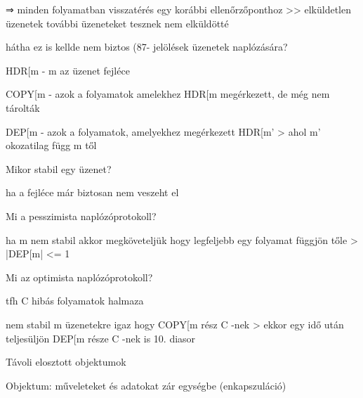\documentclass[12pt]{article}
\begin{document}
\begin{description}
                                        ⇒ minden folyamatban visszatérés egy korábbi ellenőrzőponthoz
                                        >> elküldetlen üzenetek további üzeneteket tesznek nem elküldötté
                                    \item hátha ez is kellde nem biztos (87-
                                        jelölések üzenetek naplózására?
                                    \item HDR[m 
                                            - m az üzenet fejléce 
                                        \item COPY[m
                                                - azok a folyamatok amelekhez HDR[m megérkezett, de még nem tárolták
                                                \item DEP[m
                                                        - azok a folyamatok, amelyekhez megérkezett HDR[m' 
                                                            > ahol m' okozatilag függ m től
                                                        \item  Mikor stabil egy üzenet?
                                                        \item ha a fejléce már biztosan nem veszeht el
                                                        \item  Mi a pesszimista naplózóprotokoll?
                                                        \item ha m nem stabil akkor megköveteljük hogy legfeljebb egy folyamat függjön tőle
                                                            > |DEP[m| <= 1
                                                            \item  Mi az optimista naplózóprotokoll?
                                                            \item tfh C hibás folyamatok halmaza
                                                            \item nem stabil m üzenetekre igaz hogy COPY[m rész C -nek
                                                                    > ekkor egy idő után teljesüljön DEP[m része C -nek  is 
                                                                        10. diasor
                                                                    \item  Távoli elosztott objektumok
                                                                    \item Objektum: műveleteket és adatokat zár egységbe (enkapszuláció)

\end{description}
\end{document}
